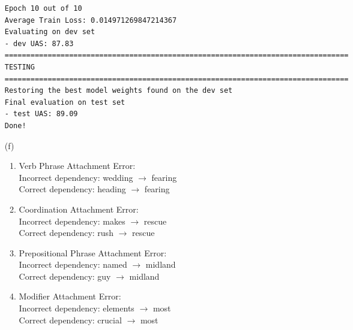 \documentclass{article}
\begin{document}
\begin{enumerate}[label=(\alph*)]
\begin{verbatim}
Epoch 10 out of 10
Average Train Loss: 0.014971269847214367
Evaluating on dev set
- dev UAS: 87.83
================================================================================
TESTING
================================================================================
Restoring the best model weights found on the dev set
Final evaluation on test set
- test UAS: 89.09
Done!
\end{verbatim}

\item[(f)]
\begin{enumerate}[label=\roman*.]
    \item Verb Phrase Attachment Error:
    \\
    Incorrect dependency: wedding $\rightarrow$ fearing
    \\
    Correct dependency: heading $\rightarrow$ fearing
    \item Coordination Attachment Error:
    \\
    Incorrect dependency: makes $\rightarrow$ rescue
    \\
    Correct dependency: rush $\rightarrow$ rescue
    \item Prepositional Phrase Attachment Error:
    \\
    Incorrect dependency: named $\rightarrow$ midland
    \\
    Correct dependency: guy $\rightarrow$ midland
    \item Modifier Attachment Error:
    \\
    Incorrect dependency: elements $\rightarrow$ most
    \\
    Correct dependency: crucial $\rightarrow$ most
\end{enumerate}

\end{enumerate}
\end{document}
